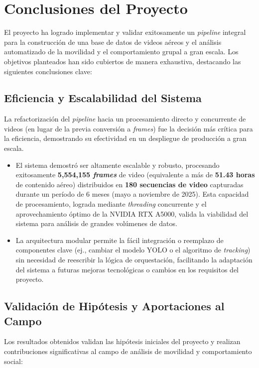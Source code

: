 \section{Conclusiones del Proyecto}
El proyecto ha logrado implementar y validar exitosamente un \textit{pipeline} integral para la construcción de una base de datos de videos aéreos y el análisis automatizado de la movilidad y el comportamiento grupal a gran escala. Los objetivos planteados han sido cubiertos de manera exhaustiva, destacando las siguientes conclusiones clave:

\subsection{Eficiencia y Escalabilidad del Sistema}
La refactorización del \textit{pipeline} hacia un procesamiento directo y concurrente de videos (en lugar de la previa conversión a \textit{frames}) fue la decisión más crítica para la eficiencia, demostrando su efectividad en un despliegue de producción a gran escala.

\begin{itemize}
	\item El sistema demostró ser altamente escalable y robusto, procesando exitosamente \textbf{5,554,155 \textit{frames}} de video (equivalente a más de \textbf{51.43 horas} de contenido aéreo) distribuidos en \textbf{180 secuencias de video} capturadas durante un período de 6 meses (mayo a noviembre de 2025). Esta capacidad de procesamiento, lograda mediante \textit{threading} concurrente y el aprovechamiento óptimo de la NVIDIA RTX A5000, valida la viabilidad del sistema para análisis de grandes volúmenes de datos.
	\item La arquitectura modular permite la fácil integración o reemplazo de componentes clave (ej., cambiar el modelo YOLO o el algoritmo de \textit{tracking}) sin necesidad de reescribir la lógica de orquestación, facilitando la adaptación del sistema a futuras mejoras tecnológicas o cambios en los requisitos del proyecto.
\end{itemize}

\cleardoublepage

\subsection{Validación de Hipótesis y Aportaciones al Campo}
Los resultados obtenidos validan las hipótesis iniciales del proyecto y realizan contribuciones significativas al campo de análisis de movilidad y comportamiento social:

